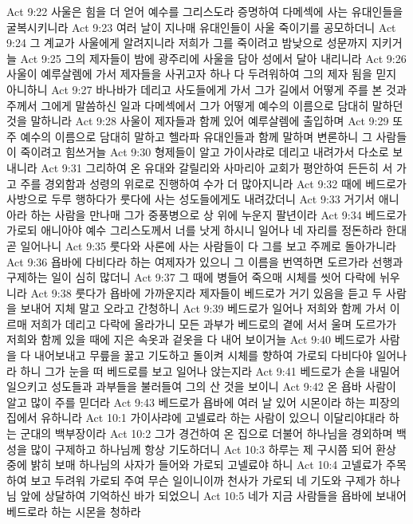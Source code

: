Act 9:22  사울은 힘을 더 얻어 예수를 그리스도라 증명하여 다메섹에 사는 유대인들을 굴복시키니라
Act 9:23  여러 날이 지나매 유대인들이 사울 죽이기를 공모하더니
Act 9:24  그 계교가 사울에게 알려지니라 저희가 그를 죽이려고 밤낮으로 성문까지 지키거늘
Act 9:25  그의 제자들이 밤에 광주리에 사울을 담아 성에서 달아 내리니라
Act 9:26  사울이 예루살렘에 가서 제자들을 사귀고자 하나 다 두려워하여 그의 제자 됨을 믿지 아니하니
Act 9:27  바나바가 데리고 사도들에게 가서 그가 길에서 어떻게 주를 본 것과 주께서 그에게 말씀하신 일과 다메섹에서 그가 어떻게 예수의 이름으로 담대히 말하던 것을 말하니라
Act 9:28  사울이 제자들과 함께 있어 예루살렘에 출입하며
Act 9:29  또 주 예수의 이름으로 담대히 말하고 헬라파 유대인들과 함께 말하며 변론하니 그 사람들이 죽이려고 힘쓰거늘
Act 9:30  형제들이 알고 가이사랴로 데리고 내려가서 다소로 보내니라
Act 9:31  그리하여 온 유대와 갈릴리와 사마리아 교회가 평안하여 든든히 서 가고 주를 경외함과 성령의 위로로 진행하여 수가 더 많아지니라
Act 9:32  때에 베드로가 사방으로 두루 행하다가 룻다에 사는 성도들에게도 내려갔더니
Act 9:33  거기서 애니아라 하는 사람을 만나매 그가 중풍병으로 상 위에 누운지 팔년이라
Act 9:34  베드로가 가로되 애니아야 예수 그리스도께서 너를 낫게 하시니 일어나 네 자리를 정돈하라 한대 곧 일어나니
Act 9:35  룻다와 사론에 사는 사람들이 다 그를 보고 주께로 돌아가니라
Act 9:36  욥바에 다비다라 하는 여제자가 있으니 그 이름을 번역하면 도르가라 선행과 구제하는 일이 심히 많더니
Act 9:37  그 때에 병들어 죽으매 시체를 씻어 다락에 뉘우니라
Act 9:38  룻다가 욥바에 가까운지라 제자들이 베드로가 거기 있음을 듣고 두 사람을 보내어 지체 말고 오라고 간청하니
Act 9:39  베드로가 일어나 저희와 함께 가서 이르매 저희가 데리고 다락에 올라가니 모든 과부가 베드로의 곁에 서서 울며 도르가가 저희와 함께 있을 때에 지은 속옷과 겉옷을 다 내어 보이거늘
Act 9:40  베드로가 사람을 다 내어보내고 무릎을 꿇고 기도하고 돌이켜 시체를 향하여 가로되 다비다야 일어나라 하니 그가 눈을 떠 베드로를 보고 일어나 앉는지라
Act 9:41  베드로가 손을 내밀어 일으키고 성도들과 과부들을 불러들여 그의 산 것을 보이니
Act 9:42  온 욥바 사람이 알고 많이 주를 믿더라
Act 9:43  베드로가 욥바에 여러 날 있어 시몬이라 하는 피장의 집에서 유하니라
Act 10:1  가이사랴에 고넬료라 하는 사람이 있으니 이달리야대라 하는 군대의 백부장이라
Act 10:2  그가 경건하여 온 집으로 더불어 하나님을 경외하며 백성을 많이 구제하고 하나님께 항상 기도하더니
Act 10:3  하루는 제 구시쯤 되어 환상 중에 밝히 보매 하나님의 사자가 들어와 가로되 고넬료야 하니
Act 10:4  고넬료가 주목하여 보고 두려워 가로되 주여 무슨 일이니이까 천사가 가로되 네 기도와 구제가 하나님 앞에 상달하여 기억하신 바가 되었으니
Act 10:5  네가 지금 사람들을 욥바에 보내어 베드로라 하는 시몬을 청하라
